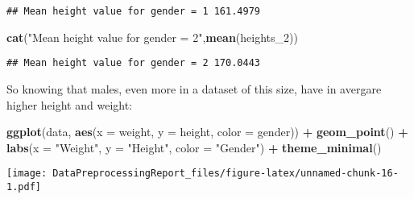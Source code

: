 \documentclass[
]{article}
\newenvironment{Shaded}{\begin{snugshade}}{\end{snugshade}}
\newcommand{\AttributeTok}[1]{\textcolor[rgb]{0.13,0.29,0.53}{#1}}
\newcommand{\DecValTok}[1]{\textcolor[rgb]{0.00,0.00,0.81}{#1}}
\newcommand{\FunctionTok}[1]{\textcolor[rgb]{0.13,0.29,0.53}{\textbf{#1}}}
\newcommand{\NormalTok}[1]{#1}
\newcommand{\OtherTok}[1]{\textcolor[rgb]{0.56,0.35,0.01}{#1}}
\newcommand{\SpecialCharTok}[1]{\textcolor[rgb]{0.81,0.36,0.00}{\textbf{#1}}}
\newcommand{\StringTok}[1]{\textcolor[rgb]{0.31,0.60,0.02}{#1}}
\begin{document}
\begin{verbatim}
## Mean height value for gender = 1 161.4979
\end{verbatim}

\begin{Shaded}
\begin{Highlighting}[]
\FunctionTok{cat}\NormalTok{(}\StringTok{"Mean height value for gender = 2"}\NormalTok{,}\FunctionTok{mean}\NormalTok{(heights\_2))}
\end{Highlighting}
\end{Shaded}

\begin{verbatim}
## Mean height value for gender = 2 170.0443
\end{verbatim}

So knowing that males, even more in a dataset of this size, have in
avergare higher height and weight:

\begin{Shaded}
\end{Shaded}

\begin{Shaded}
\begin{Highlighting}[]
\FunctionTok{ggplot}\NormalTok{(data, }\FunctionTok{aes}\NormalTok{(}\AttributeTok{x =}\NormalTok{ weight, }\AttributeTok{y =}\NormalTok{ height, }\AttributeTok{color =}\NormalTok{ gender)) }\SpecialCharTok{+}
  \FunctionTok{geom\_point}\NormalTok{() }\SpecialCharTok{+}
  \FunctionTok{labs}\NormalTok{(}\AttributeTok{x =} \StringTok{"Weight"}\NormalTok{, }\AttributeTok{y =} \StringTok{"Height"}\NormalTok{, }\AttributeTok{color =} \StringTok{"Gender"}\NormalTok{) }\SpecialCharTok{+}
  \FunctionTok{theme\_minimal}\NormalTok{()}
\end{Highlighting}
\end{Shaded}

\texttt{[image: DataPreprocessingReport\_files/figure-latex/unnamed-chunk-16-1.pdf]}
\end{document}
